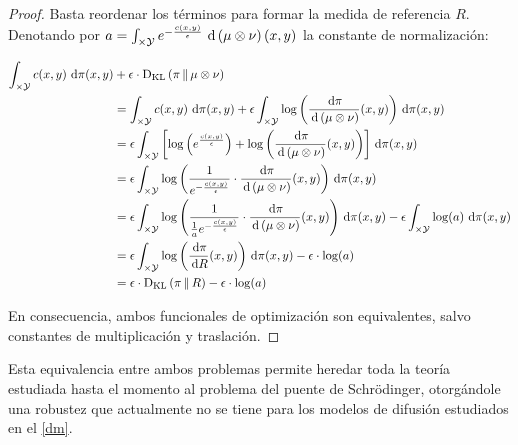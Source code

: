 \begin{proof}

	Basta reordenar los términos para formar la medida de referencia $R$. Denotando por $a=\int_{\times\mathcal{Y}} e^{-\frac{c(x,y)}{\epsilon}}\,\operatorname{d}\!\,\left(\mu\otimes\nu\right)(x,y)$ la constante de normalización:

	\begin{align*}
		\int_{\xspace\times\yspace} c(x,y) \d\pi(x,y) &+ \epsilon\cdot\KL{\pi}{\mu\otimes\nu}\\
		&= \int_{\xspace\times\yspace} c(x,y) \d\pi(x,y) + \epsilon \int_{\xspace\times\yspace} \log\parent{\frac{\d\pi}{\d\,\parent{\mu\otimes\nu}}(x,y)} \d\pi(x,y)\\
		&= \epsilon \int_{\xspace\times\yspace} \rparent{\log\parent{e^{\frac{c(x,y)}{\epsilon}}} + \log\parent{\frac{\d\pi}{\d\,\parent{\mu\otimes\nu}}(x,y)}} \d\pi(x,y)\\
		&= \epsilon \int_{\xspace\times\yspace} \log\parent{\frac{1}{e^{-\frac{c(x,y)}{\epsilon}}}\cdot\frac{\d\pi}{\d\,\parent{\mu\otimes\nu}}(x,y)} \d\pi(x,y)\\
		&= \epsilon \int_{\xspace\times\yspace} \log\parent{\frac{1}{\frac{1}{a}e^{-\frac{c(x,y)}{\epsilon}}}\cdot\frac{\d\pi}{\d\,\parent{\mu\otimes\nu}}(x,y)}\d\pi(x,y) - \epsilon\int_{\xspace\times\yspace} \log(a) \d\pi(x,y)\\
		&=\epsilon\int_{\xspace\times\yspace}\log\parent{\frac{\d\pi}{\d R}(x,y)}\d\pi(x,y)- \epsilon\cdot\log(a)\\
		&= \epsilon\cdot \KL{\pi}{R} - \epsilon\cdot\log(a)
	\end{align*}

	En consecuencia, ambos funcionales de optimización son equivalentes, salvo constantes de multiplicación y traslación.
	
\end{proof}

Esta equivalencia entre ambos problemas permite heredar toda la teoría estudiada hasta el momento al problema del puente de Schrödinger, otorgándole una robustez que actualmente no se tiene para los modelos de difusión estudiados en el \autoref{dm}. 



